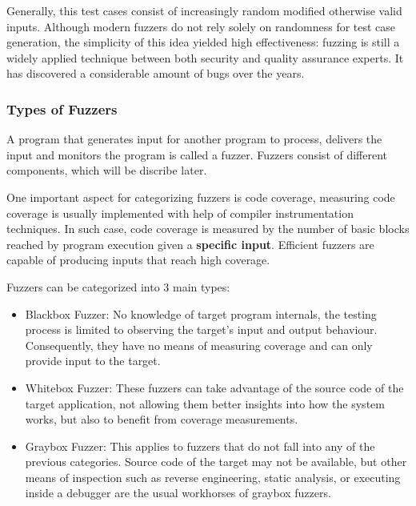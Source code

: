 Generally, this test cases consist of increasingly random modified otherwise valid inputs. Although modern
fuzzers do not rely solely on randomness for test case generation, the simplicity of this idea yielded high
effectiveness: fuzzing is still a widely applied technique between both security and quality assurance experts.
It has discovered a considerable amount of bugs over the years.



\subsubsection{Types of Fuzzers}

A program that generates input for another program to process, delivers the input and monitors the program
is called a fuzzer. Fuzzers consist of different components, which will be discribe later.

One important aspect for categorizing fuzzers is code coverage, measuring code coverage is usually implemented
with help of compiler instrumentation techniques. In such case, code coverage is measured by the number of
basic blocks reached by program execution given a \textbf{specific input}. Efficient fuzzers are capable of producing inputs that reach high coverage.

Fuzzers can be categorized into 3 main types:

\begin{itemize}
    \item Blackbox Fuzzer: No knowledge of target program internals, the testing process is limited to observing the target's input and output behaviour. Consequently, they have no means of measuring coverage and can only provide input to the target.
    \item Whitebox Fuzzer: These fuzzers can take advantage of the source code of the target application, not allowing them better insights into how the system works, but also to benefit from coverage measurements.
    \item Graybox Fuzzer: This applies to fuzzers that do not fall into any of the previous categories. Source code of the target may not be available, but other means of inspection such as reverse engineering, static analysis, or executing inside a debugger are the usual workhorses of graybox fuzzers\cite{mcnally12}.
\end{itemize}


